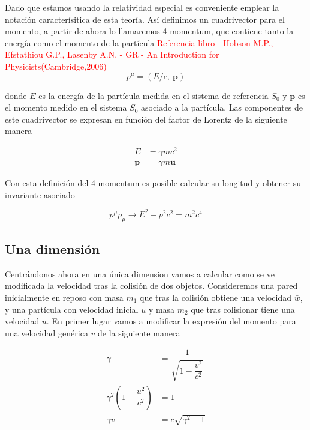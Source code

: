 \documentclass[11pt, spanish]{book}
\begin{document}
Dado que estamos usando la relatividad especial es conveniente emplear la notación caracterísitica de esta teoría. Así definimos un cuadrivector para el momento, a partir de ahora lo llamaremos 4-momentum, que contiene tanto la energía como el momento de la partícula
\textcolor{red}{Referencia libro - Hobson M.P., Efstathiou G.P., Lasenby A.N. - GR - An Introduction for Physicists(Cambridge,2006) }
\begin{equation}\label{eq:4-momentum}
    p^\mu = (E/c, \: \mathbf{p})
\end{equation}

donde \( E \) es la energía de la partícula medida en el sistema de referencia \( S_0 \) y \( \mathbf{p} \) es el momento medido en el sistema \( S_0 \) asociado a la partícula. Las componentes de este cuadrivector se expresan en función del factor de Lorentz de la siguiente manera

\begin{align}
    E &= \gamma m c^2 \\
    \mathbf{p} &= \gamma m \mathbf{u}
\end{align}

Con esta definición del 4-momentum es posible calcular su longitud y obtener su invariante asociado

\begin{equation}\label{eq:invariamente_momento_energia}
    p^\mu p_\mu \longrightarrow E^2 - p^2 c^2 = m^2c^4
\end{equation}

\vspace{3mm}

\subsection{Una dimensión}

Centrándonos ahora en una única dimension vamos a calcular como se ve modificada la velocidad tras la colisión de dos objetos. Consideremos una pared inicialmente en reposo con masa \( m_1 \) que tras la colisión obtiene una velocidad \( \bar{w} \), y una partícula con velocidad inicial \( u \) y masa \( m _2 \) que tras colisionar tiene una velocidad \( \bar{u} \). En primer lugar vamos a modificar la expresión del momento para una velocidad genérica \( v \) de la siguiente manera

\begin{align}
    \gamma &= \dfrac{1}{\sqrt{1 - \dfrac{v^2}{c^2}}} \\
    \gamma^2\left( 1 - \dfrac{u^2}{c^2} \right) &= 1 \nonumber \\
    \gamma v &= c\sqrt{\gamma^2 -1}
\end{align}
\end{document}
